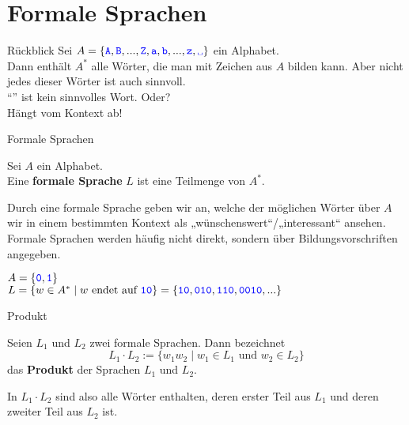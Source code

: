 \section{Formale Sprachen}

\begin{frame}{Rückblick}
	Sei $A = \{\word A, \word B, ..., \word Z, \word a, \word b, ..., \word z, \word\sp\}$ ein Alphabet.\\
	\pause
	Dann enthält $A^*$ alle Wörter, die man mit Zeichen aus $A$ bilden kann. Aber nicht jedes dieser Wörter ist auch sinnvoll.\\[1em]
	
	\enquote{} ist kein sinnvolles Wort. \pause Oder? \\[1em]
	\pause
	\impl Hängt vom Kontext ab!\\
	
\end{frame}

\begin{frame}{Formale Sprachen}
		\begin{Definition}
			Sei $A$ ein Alphabet.\\
			Eine \textbf{formale Sprache} $L$ ist eine Teilmenge von $A^*$.
		\end{Definition}
		\pause
		\vspace{10pt}
		Durch eine formale Sprache geben wir an, welche der möglichen Wörter über $A$ wir in einem bestimmten Kontext als „wünschenswert“/„interessant“ ansehen.\\
		\pause \smallskip
		Formale Sprachen werden häufig nicht direkt, sondern über Bildungsvorschriften angegeben.
		
		\pause
		\begin{Beispiel}
			$A = \{\hbox{\textcolor{blue}{\texttt{0}}}, \hbox{\textcolor{blue}{\texttt{1}}}\}$ \\
			$L = \{ w \in A^* \mid w \text{ endet auf } \hbox{\textcolor{blue}{\texttt{10}}} \}  = \{\hbox{\textcolor{blue}{\texttt{10}}}, \hbox{\textcolor{blue}{\texttt{010}}}, \hbox{\textcolor{blue}{\texttt{110}}}, \hbox{\textcolor{blue}{\texttt{0010}}}, ...\}$
		\end{Beispiel}
\end{frame}









\begin{frame}{Produkt}
		\begin{Definition}
			Seien $L_1$ und $L_2$ zwei formale Sprachen. Dann bezeichnet
				$$L_1 \cdot L_2 := \{w_1 w_2 \mid w_1 \in L_1 \text{ und } w_2 \in L_2 \}$$
				das \textbf{Produkt} der Sprachen $L_1$ und $L_2$.
		\end{Definition}
		\pause
		In $L_1 \cdot L_2$ sind also alle Wörter enthalten, deren erster Teil aus $L_1$ und deren zweiter Teil aus $L_2$ ist.
	
\end{frame}

